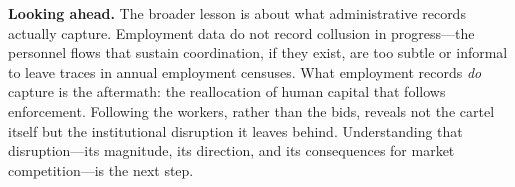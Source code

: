 \noindent\textbf{Looking ahead.} The broader lesson is about what administrative records actually capture. Employment data do not record collusion in progress---the personnel flows that sustain coordination, if they exist, are too subtle or informal to leave traces in annual employment censuses. What employment records \emph{do} capture is the aftermath: the reallocation of human capital that follows enforcement. Following the workers, rather than the bids, reveals not the cartel itself but the institutional disruption it leaves behind. Understanding that disruption---its magnitude, its direction, and its consequences for market competition---is the next step.
